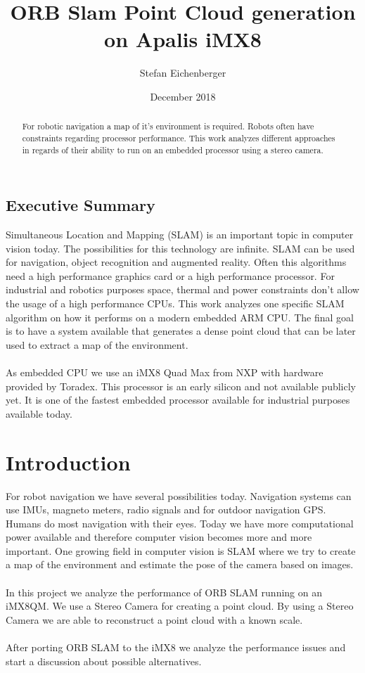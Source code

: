 \documentclass[11pt,a4paper,titlepage,oneside]{report}
\title{ORB Slam Point Cloud generation on Apalis iMX8}
\author{Stefan Eichenberger}
\date{December 2018}
\begin{document}
\maketitle

\begin{abstract}
	For robotic navigation a map of it's environment is required. Robots often have constraints regarding processor performance. This work analyzes different approaches in regards of their ability to run on an embedded processor using a stereo camera.
\end{abstract}

\section*{Executive Summary}
Simultaneous Location and Mapping (SLAM) is an important topic in computer vision today. The possibilities for this technology are infinite. SLAM can be used for navigation, object recognition and augmented reality. Often this algorithms need a high performance graphics card or a high performance processor. For industrial and robotics purposes space, thermal and power constraints don't allow the usage of a high performance CPUs. This work analyzes one specific SLAM algorithm on how it performs on a modern embedded ARM CPU. The final goal is to have a system available that generates a dense point cloud that can be later used to extract a map of the environment.\\\\
As embedded CPU we use an iMX8 Quad Max from NXP with hardware provided by Toradex. This processor is an early silicon and not available publicly yet. It is one of the fastest embedded processor available for industrial purposes available today.\\

\tableofcontents

\chapter{Introduction}
For robot navigation we have several possibilities today. Navigation systems can use IMUs, magneto meters, radio signals and for outdoor navigation GPS. Humans do most navigation with their eyes. Today we have more computational power available and therefore computer vision becomes more and more important. One growing field in computer vision is SLAM where we try to create a map of the environment and estimate the pose of the camera based on images.\\\\
In this project we analyze the performance of ORB SLAM \cite{orbslam} running on an iMX8QM. We use a Stereo Camera for creating a point cloud. By using a Stereo Camera we are able to reconstruct a point cloud with a known scale.\\\\
After porting ORB SLAM to the iMX8 we analyze the performance issues and start a discussion about possible alternatives.
\end{document}
